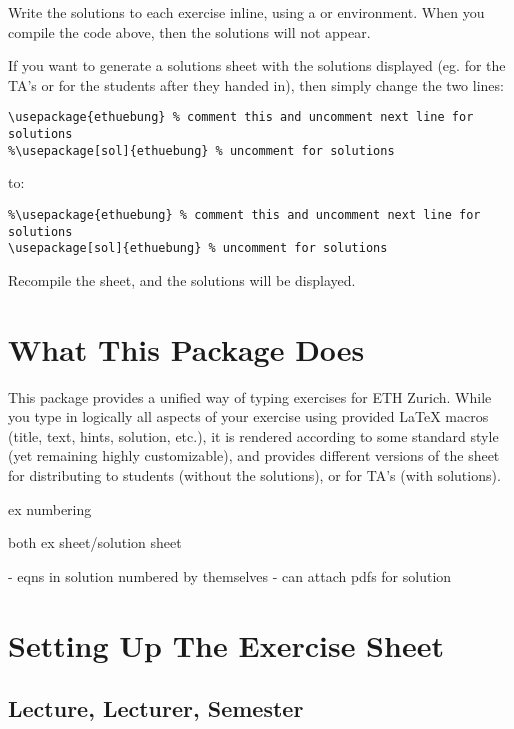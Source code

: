 \documentclass[11pt,a4paper]{article}
\begin{document}
Write the solutions to each exercise inline, using a  or 
environment. When you compile the code above, then the solutions will not appear.

If you want to generate a solutions sheet with the solutions displayed (eg. for the TA's
or for the students after they handed in), then simply change the two lines:
\begin{pkgverbatim}
\begin{verbatim}
\usepackage{ethuebung} % comment this and uncomment next line for solutions
%\usepackage[sol]{ethuebung} % uncomment for solutions
\end{verbatim}
\end{pkgverbatim}
to:
\begin{pkgverbatim}
\begin{verbatim}
%\usepackage{ethuebung} % comment this and uncomment next line for solutions
\usepackage[sol]{ethuebung} % uncomment for solutions
\end{verbatim}
\end{pkgverbatim}

Recompile the sheet, and the solutions will be displayed.


\section{What This Package Does}

This package provides a unified way of typing exercises for ETH Zurich. While you type in
logically all aspects of your exercise using provided \LaTeX{} macros (title, text, hints,
solution, etc.), it is rendered according to some standard style (yet remaining highly
customizable), and provides different versions of the sheet for distributing to students
(without the solutions), or for TA's (with solutions).



ex numbering

both ex sheet/solution sheet

  - eqns in solution numbered by themselves
  - can attach pdfs for solution


\section{Setting Up The Exercise Sheet}
\label{sec:SetupSheet}

\subsection{Lecture, Lecturer, Semester}
\end{document}
